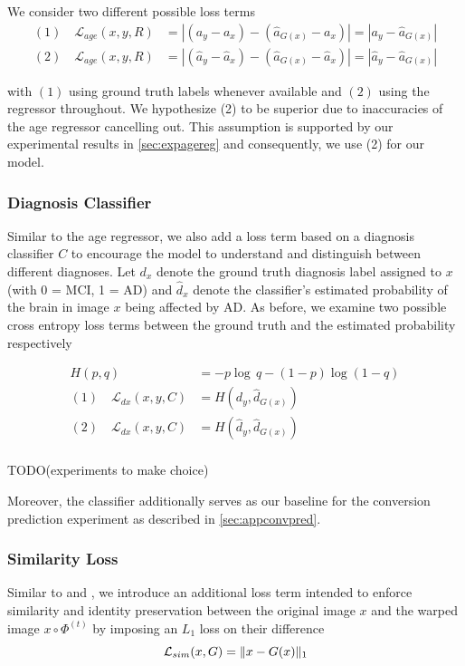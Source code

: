 We consider two different possible loss terms 
\begin{equation}
	\begin{split}
		(1) \quad \mathcal{L}_{age}(x, y, R) & = 
		| (a_y - a_x) - (\hat a_{G(x)} - a_x) | =
		| a_y - \hat a_{G(x)} | \\[8pt]
		(2) \quad \mathcal{L}_{age}(x, y, R) & =
		| (\hat a_y - \hat a_x) - (\hat a_{G(x)} - \hat a_x) | = 
		| \hat a_y - \hat a_{G(x)} |
	\end{split}
\end{equation}

with $(1)$ using ground truth labels whenever available and $(2)$ using the regressor throughout. We hypothesize (2) to be superior due to inaccuracies of the age regressor cancelling out. This assumption is supported by our experimental results in \autoref{sec:expagereg} and consequently, we use (2) for our model.

\subsubsection*{Diagnosis Classifier}
Similar to the age regressor, we also add a loss term based on a diagnosis classifier $C$ to encourage the model to understand and distinguish between different diagnoses. Let $d_x$ denote the ground truth diagnosis label assigned to $x$ (with 0 = MCI, 1 = AD) and $\hat d_x$ denote the classifier's estimated probability of the brain in image $x$ being affected by AD. As before, we examine two possible cross entropy loss terms between the ground truth and the estimated probability respectively

\begin{equation}
	\begin{split}
		H(p, q) & = -p \log\, q - (1 - p)\log(1 - q) \\[8pt]
		(1) \quad \mathcal{L}_{dx}(x, y, C) & = 
		H(d_y, \hat d_{G(x)}) \\[8pt]
		(2) \quad \mathcal{L}_{dx}(x, y, C) & =
		H(\hat d_y, \hat d_{G(x)}) \\[8pt]
	\end{split}
\end{equation}

TODO(experiments to make choice)

Moreover, the classifier additionally serves as our baseline for the conversion prediction experiment as described in \autoref{sec:appconvpred}.

\subsubsection*{Similarity Loss}
Similar to \cite{VAGAN} and \cite{wegmayr}, we introduce an additional loss term intended to enforce similarity and identity preservation between the original image $x$ and the warped image $ x \circ \Phi^{(t)} $ by imposing an $L_1$ loss on their difference
\begin{equation}
	\mathcal{L}_{sim}( x, G ) = \lVert x - G(x) \rVert_1
\end{equation}


